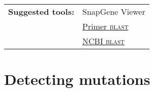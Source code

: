 \documentclass[11pt]{article}
\begin{document}
	\vspace*{\baselineskip}

	\noindent\begin{tabular}{@{}ll}
		\textbf{Suggested tools:} & SnapGene Viewer \\
		& \href{https://www.ncbi.nlm.nih.gov/tools/primer-blast/}{Primer \textsc{blast}} \\
		& \href{https://blast.ncbi.nlm.nih.gov/Blast.cgi}{NCBI \textsc{blast}} \\
	\end{tabular} 
	
	\section{Detecting mutations\label{sec:mut}}
 	
 	
\end{document}
